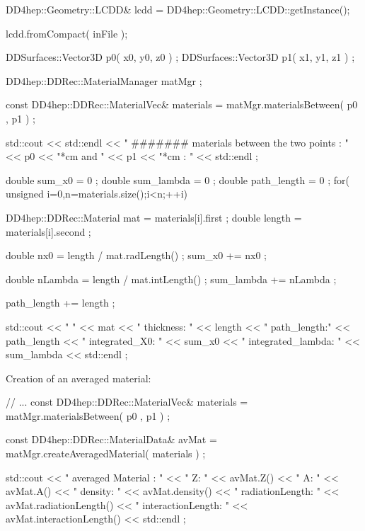 \documentclass[10pt,a4paper]{article}
\begin{document}
\begin{code}

  DD4hep::Geometry::LCDD& lcdd = DD4hep::Geometry::LCDD::getInstance();

  lcdd.fromCompact( inFile );

  DDSurfaces::Vector3D p0( x0, y0, z0 ) ;
  DDSurfaces::Vector3D p1( x1, y1, z1 ) ;

  DD4hep::DDRec::MaterialManager matMgr ;

  const DD4hep::DDRec::MaterialVec& materials = matMgr.materialsBetween( p0 , p1  ) ;
	
  std::cout  << std::endl  
             << " #######  materials between the two  points : " 
             << p0 << "*cm  and " << p1 << "*cm :  "  
             << std::endl ;

  double sum_x0 = 0 ;
  double sum_lambda = 0 ;
  double path_length = 0 ;
  for( unsigned i=0,n=materials.size();i<n;++i){

    DD4hep::DDRec::Material mat =  materials[i].first  ;
    double length = materials[i].second  ;

    double nx0 = length / mat.radLength()  ;
    sum_x0 += nx0 ;

    double nLambda = length / mat.intLength()  ;
    sum_lambda += nLambda ;

    path_length += length ;

    std::cout << "      "               << mat 
              << " thickness: "         << length 
              << " path_length:"        << path_length
              << " integrated_X0: "     << sum_x0 
              << " integrated_lambda: " << sum_lambda 
              <<  std::endl ;
  }

\end{code}

\noindent
Creation of an averaged material:

\begin{code}
  // ...
  const DD4hep::DDRec::MaterialVec& materials = matMgr.materialsBetween( p0 , p1  ) ;
	
  const DD4hep::DDRec::MaterialData& avMat = matMgr.createAveragedMaterial( materials ) ;

  std::cout << " averaged Material : " << " Z: " << avMat.Z() << " A: " << avMat.A() 
            << " density: "            << avMat.density()
            << " radiationLength: "    << avMat.radiationLength() 
            << " interactionLength: "  << avMat.interactionLength()  
            << std::endl ;
\end{code}
\end{document}
